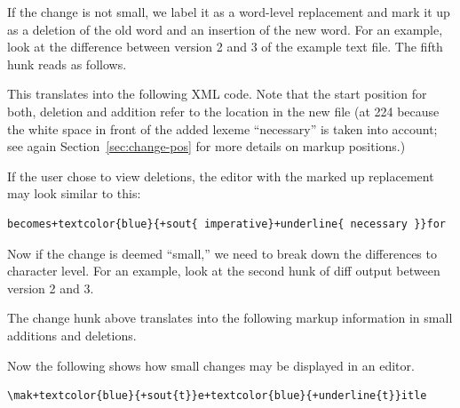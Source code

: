 If the change is not small, we label it as a word-level replacement and mark it up as a deletion of the old word and an insertion of the new word.  For an example, look at the difference between version 2 and 3 of the example text file.  The fifth hunk reads as follows.


This translates into the following XML code.  Note that the start position for both, deletion and addition refer to the location in the new file (at 224 because the white space in front of the added lexeme ``necessary'' is taken into account; see again Section~\ref{sec:change-pos} for more details on markup positions.)


If the user chose to view deletions, the editor with the marked up replacement may look similar to this:

\begin{Verbatim}[frame=lines,label={Markup of whole word change blocks},showspaces=true,commandchars=+\{\}]
becomes+textcolor{blue}{+sout{ imperative}+underline{ necessary }}for
\end{Verbatim}

Now if the change is deemed ``small,'' we need to break down the differences to character level.  For an example, look at the second hunk of diff output between version 2 and 3.


The change hunk above translates into the following markup information in small additions and deletions.  


Now the following shows how small changes may be displayed in an editor.  

\begin{Verbatim}[frame=lines,label={Markup of a small change},samepage=true,showspaces=true,commandchars=+\{\}]
\mak+textcolor{blue}{+sout{t}}e+textcolor{blue}{+underline{t}}itle
\end{Verbatim}

